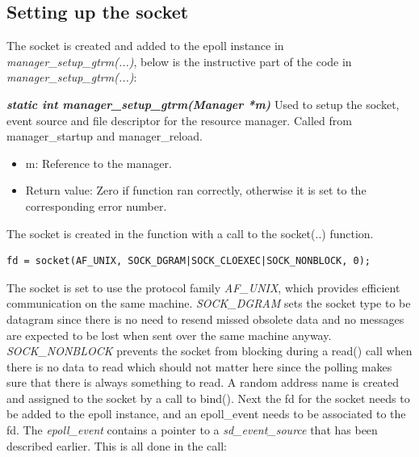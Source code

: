 \documentclass[nobiblatex]{LTHthesis}
\begin{document}
\subsection{Setting up the socket}

The socket is created and added to the epoll instance in \emph{manager\_setup\_gtrm(...)}, below is the instructive part of the code in \emph{manager\_setup\_gtrm(...)}:




\begin{framed}
		\begin{flushleft}
		
			\textbf{\emph{{static int manager\_setup\_gtrm(Manager *m)}}} \newline
			Used to setup the socket, event source and file descriptor for the resource manager. Called from manager\_startup and manager\_reload.
			\begin{itemize}
			\item m: Reference to the manager.
			\item Return value: Zero if function ran correctly, otherwise it is set to the corresponding error number.
			\end{itemize}
		\end{flushleft}	
\end{framed}







The socket is created in the function  with a call to the socket(..) function.
\begin{verbatim}
fd = socket(AF_UNIX, SOCK_DGRAM|SOCK_CLOEXEC|SOCK_NONBLOCK, 0);
\end{verbatim}

The socket is set to use the protocol family \emph{AF\_UNIX}, which provides efficient communication on the same machine. \emph{SOCK\_DGRAM} sets the socket type to be datagram since there is no need to resend missed obsolete data and no messages are expected to be lost when sent over the same machine anyway. \emph{SOCK\_NONBLOCK} prevents the socket from blocking during a read() call when there is no data to read which should not matter here since the polling makes sure that there is always something to read. A random address name is created and assigned to the socket by a call to bind(). Next the fd for the socket needs to be added to the epoll instance, and an epoll\_event needs to be associated to the fd. The \emph{epoll\_event} contains a pointer to a \emph{sd\_event\_source} that has been described earlier. This is all done in the call:  
\end{document}
